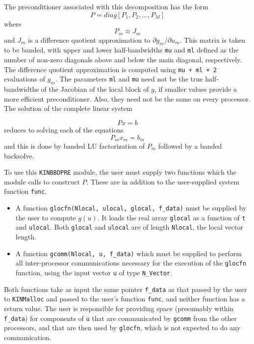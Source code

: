 \documentclass[11pt]{article}
\begin{document}
The preconditioner associated with this decomposition has the form 
\begin{equation}
P= diag[P_1, P_2, \ldots, P_M]
\end{equation}
where 
\begin{equation}
P_m \approx J_m
\end{equation}
and $J_m$ is a difference quotient approximation to 
$\partial g_m/\partial u_m$. This matrix is taken to be banded, with
upper and lower half-bandwidths {\tt mu} and {\tt ml} defined as
the number of non-zero diagonals above and below the main diagonal,
respectively. The difference quotient approximation is computed using
{\tt mu + ml + 2} evaluations of $g_m$. The parameters {\tt ml} and
{\tt mu} need not be the true half-bandwidths of the Jacobian of the
local block of $g$, if smaller values provide a more efficient
preconditioner. Also, they need not be the same on every processor.
The solution of the complete linear system

\begin{equation}
Px = b
\end{equation}
reduces to solving each of the equations 
\begin{equation}
P_m x_m = b_m
\end{equation}
and this is done by banded LU factorization of $P_m$ followed by a banded
backsolve.

To use this {\tt KINBBDPRE} module, the user must supply two functions which 
the module calls to construct $P$. These are in addition to the user-supplied
system function {\tt func}.

\begin{itemize}

\item A function {\tt glocfn(Nlocal, ulocal, glocal, f\_data)} must
be supplied by the user to compute $g(u)$. It loads the real array
{\tt glocal} as a function of {\tt t} and {\tt ulocal}.  
Both {\tt glocal} and {\tt ulocal} are of length {\tt Nlocal}, the
local vector length.

\item  A function {\tt gcomm(Nlocal, u, f\_data)} which must be supplied to
perform all inter-processor communications necessary for the execution of
the {\tt glocfn} function, using the input vector {\tt u} of type 
{\tt N\_Vector}.
\end{itemize}

Both functions take as input the same pointer {\tt f\_data} as that passed
by the user to {\tt KINMalloc} and passed to the user's function {\tt func},
and neither function has a return value. The user is responsible for
providing space (presumably within {\tt f\_data}) for components of {\tt u}
that are communicated by {\tt gcomm} from the other processors, and that are
then used by {\tt glocfn}, which is not expected to do any communication.
\end{document}
